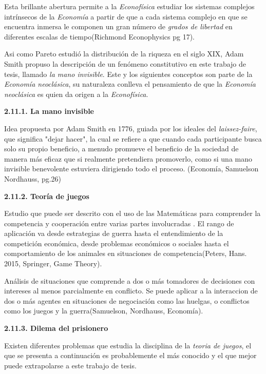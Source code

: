 Esta brillante abertura permite a la \textit{Econofísica} estudiar los sistemas complejos intrínsecos de la \textit{Economía} a partir de que a cada sistema complejo en que se encuentra inmersa le componen un gran número de \textit{grados de libertad} en diferentes escalas de tiempo(Richmond Econophysics pg 17).
\newline

Asi como Pareto estudió la distribución de la riqueza en el siglo XIX, Adam Smith propuso la descripción de un fenómeno constitutivo en este trabajo de tesis, llamado \textit{la mano invisible}. Este y los siguientes conceptos son parte de la \textit{Economía neoclásica}, su naturaleza conlleva el pensamiento de que la \textit{Economía neoclásica} es quien da origen a la \textit{Econofísica}.
\newpage

{
\noindent
\Large  \textbf{2.11.1. La mano invisible} 
}

Idea propuesta por Adam Smith en  1776, guiada por los ideales del \textit{laissez-faire}, que significa "dejar hacer", la cual se refiere a que cuando cada participante busca solo su propio beneficio, a menudo promueve el beneficio de la sociedad de manera más eficaz que si realmente pretendiera promoverlo, como si una mano invisible benevolente estuviera dirigiendo todo el proceso. (Economía, Samuelson Nordhauss, pg.26)
\newline



{
\noindent
\Large  \textbf{2.11.2. Teoría de juegos} 
}

Estudio que puede ser descrito con el uso de las Matemáticas para comprender la competencia y cooperación entre varias partes involucradas . El rango de aplicación va desde estrategias de guerra hasta el entendimiento de la competición económica, desde problemas económicos o sociales hasta el comportamiento de los animales en situaciones de competencia(Peters, Hans. 2015, Springer, Game Theory).

Análisis de situaciones que comprende a dos o más tomadores de decisiones con intereses al menos parcialmente en conflicto. Se puede aplicar a la interaccion de dos o más agentes en situaciones de negociación como las huelgas, o conflictos como los juegos y la guerra(Samuelson, Nordhauss, Economía).


{
\noindent
\Large  \textbf{2.11.3. Dilema del prisionero} 
}

Existen diferentes problemas que estudia la disciplina de la \textit{teoria de juegos}, el que se presenta a continuación es probablemente el más conocido y el que mejor puede extrapolarse a este trabajo de tesis. 

